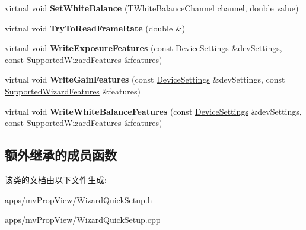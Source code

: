 \begin{DoxyCompactItemize}
\item 
\hypertarget{class_wizard_quick_setup_device_specific_a270a017bd71e97eb43f93a7eb7e8130c}{virtual void {\bfseries Set\+White\+Balance} (T\+White\+Balance\+Channel channel, double value)}\label{class_wizard_quick_setup_device_specific_a270a017bd71e97eb43f93a7eb7e8130c}

\item 
\hypertarget{class_wizard_quick_setup_device_specific_a775dec245660e82fd864c7881b24fa44}{virtual void {\bfseries Try\+To\+Read\+Frame\+Rate} (double \&)}\label{class_wizard_quick_setup_device_specific_a775dec245660e82fd864c7881b24fa44}

\item 
\hypertarget{class_wizard_quick_setup_device_specific_a11dbae7909018e80b34dcd41e6fe5bcb}{virtual void {\bfseries Write\+Exposure\+Features} (const \hyperlink{struct_wizard_quick_setup_1_1_device_settings}{Device\+Settings} \&dev\+Settings, const \hyperlink{struct_wizard_quick_setup_1_1_supported_wizard_features}{Supported\+Wizard\+Features} \&features)}\label{class_wizard_quick_setup_device_specific_a11dbae7909018e80b34dcd41e6fe5bcb}

\item 
\hypertarget{class_wizard_quick_setup_device_specific_a60ea68d15ca6145616c16323688a7ee7}{virtual void {\bfseries Write\+Gain\+Features} (const \hyperlink{struct_wizard_quick_setup_1_1_device_settings}{Device\+Settings} \&dev\+Settings, const \hyperlink{struct_wizard_quick_setup_1_1_supported_wizard_features}{Supported\+Wizard\+Features} \&features)}\label{class_wizard_quick_setup_device_specific_a60ea68d15ca6145616c16323688a7ee7}

\item 
\hypertarget{class_wizard_quick_setup_device_specific_a127720d746d6178dea323f644aa089d1}{virtual void {\bfseries Write\+White\+Balance\+Features} (const \hyperlink{struct_wizard_quick_setup_1_1_device_settings}{Device\+Settings} \&dev\+Settings, const \hyperlink{struct_wizard_quick_setup_1_1_supported_wizard_features}{Supported\+Wizard\+Features} \&features)}\label{class_wizard_quick_setup_device_specific_a127720d746d6178dea323f644aa089d1}

\end{DoxyCompactItemize}
\subsection*{额外继承的成员函数}


该类的文档由以下文件生成\+:\begin{DoxyCompactItemize}
\item 
apps/mv\+Prop\+View/Wizard\+Quick\+Setup.\+h\item 
apps/mv\+Prop\+View/Wizard\+Quick\+Setup.\+cpp\end{DoxyCompactItemize}
